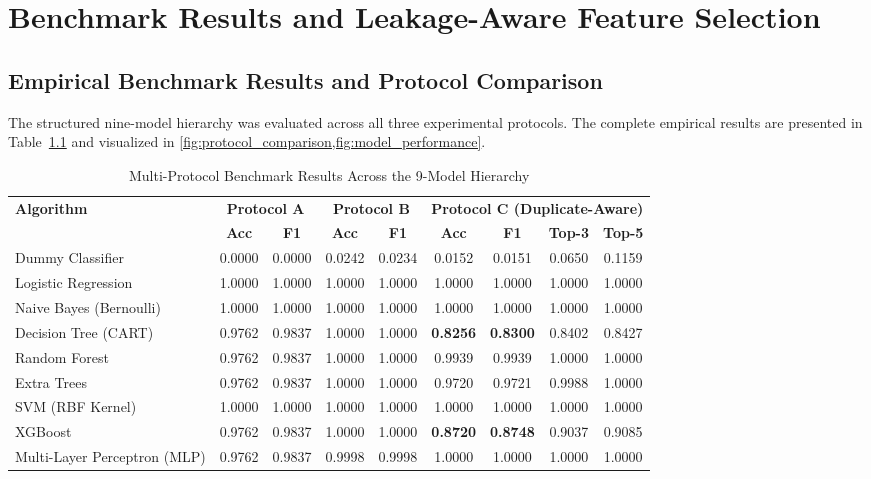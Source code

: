 \chapter{Benchmark Results and Leakage-Aware Feature Selection}
\label{chap:results_feature_selection}

\section{Empirical Benchmark Results and Protocol Comparison}
\label{sec:benchmark_results}

The structured nine-model hierarchy was evaluated across all three experimental protocols. The complete empirical results are presented in Table~\ref{tab:protocol_benchmark_results} and visualized in \cref{fig:protocol_comparison,fig:model_performance}.

\begin{table}[H]
\caption{Multi-Protocol Benchmark Results Across the 9-Model Hierarchy}
\label{tab:protocol_benchmark_results}
\centering
\footnotesize
\setlength{\tabcolsep}{3.5pt}
\begin{tabular}{l|cc|cc|cccc}
\toprule
\multirow{2}{*}{\textbf{Algorithm}} & \multicolumn{2}{c|}{\textbf{Protocol A}} & \multicolumn{2}{c|}{\textbf{Protocol B}} & \multicolumn{4}{c}{\textbf{Protocol C (Duplicate-Aware)}} \\
\cmidrule{2-9}
& \textbf{Acc} & \textbf{F1} & \textbf{Acc} & \textbf{F1} & \textbf{Acc} & \textbf{F1} & \textbf{Top-3} & \textbf{Top-5} \\
\midrule
Dummy Classifier & 0.0000 & 0.0000 & 0.0242 & 0.0234 & 0.0152 & 0.0151 & 0.0650 & 0.1159 \\
Logistic Regression & 1.0000 & 1.0000 & 1.0000 & 1.0000 & 1.0000 & 1.0000 & 1.0000 & 1.0000 \\
Naive Bayes (Bernoulli) & 1.0000 & 1.0000 & 1.0000 & 1.0000 & 1.0000 & 1.0000 & 1.0000 & 1.0000 \\
Decision Tree (CART) & 0.9762 & 0.9837 & 1.0000 & 1.0000 & \textbf{0.8256} & \textbf{0.8300} & 0.8402 & 0.8427 \\
Random Forest & 0.9762 & 0.9837 & 1.0000 & 1.0000 & 0.9939 & 0.9939 & 1.0000 & 1.0000 \\
Extra Trees & 0.9762 & 0.9837 & 1.0000 & 1.0000 & 0.9720 & 0.9721 & 0.9988 & 1.0000 \\
SVM (RBF Kernel) & 1.0000 & 1.0000 & 1.0000 & 1.0000 & 1.0000 & 1.0000 & 1.0000 & 1.0000 \\
XGBoost & 0.9762 & 0.9837 & 1.0000 & 1.0000 & \textbf{0.8720} & \textbf{0.8748} & 0.9037 & 0.9085 \\
Multi-Layer Perceptron (MLP) & 0.9762 & 0.9837 & 0.9998 & 0.9998 & 1.0000 & 1.0000 & 1.0000 & 1.0000 \\
\bottomrule
\end{tabular}
\end{table}

